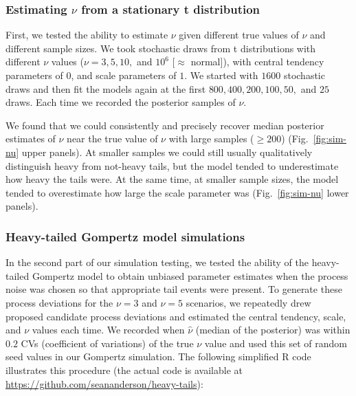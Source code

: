 \subsubsection{Estimating $\nu$ from a stationary t distribution}

First, we tested the ability to estimate $\nu$ given different true values of
$\nu$ and different sample sizes. We took stochastic draws from t
distributions with different $\nu$ values ($\nu = 3, 5, 10,$ and $10^6$
[$\approx$ normal]), with central tendency parameters of $0$, and scale
parameters of $1$. We started with $1600$ stochastic draws and then fit the
models again at the first $800, 400, 200, 100, 50,$ and $25$ draws. Each time
we recorded the posterior samples of $\nu$.

We found that we could consistently and precisely recover median posterior
estimates of $\nu$ near the true value of $\nu$ with large samples ($\ge 200$)
(Fig.~\ref{fig:sim-nu} upper panels). At smaller samples we could still
usually qualitatively distinguish heavy from not-heavy tails, but the model
tended to underestimate how heavy the tails were. At the same time, at smaller
sample sizes, the model tended to overestimate how large the scale parameter
was (Fig.~\ref{fig:sim-nu} lower panels).

\subsubsection{Heavy-tailed Gompertz model simulations}

In the second part of our simulation testing, we tested the ability of the
heavy-tailed Gompertz model to obtain unbiased parameter estimates when the
process noise was chosen so that appropriate tail events were present. To
generate these process deviations for the $\nu = 3$ and $\nu = 5$ scenarios,
we repeatedly drew proposed candidate process deviations and estimated the
central tendency, scale, and $\nu$ values each time. We recorded when
$\hat{\nu}$ (median of the posterior) was within $0.2$ CVs (coefficient of
variations) of the true $\nu$ value and used this set of random seed values in
our Gompertz simulation. The following simplified R code illustrates this
procedure (the actual code is available at
\url{https://github.com/seananderson/heavy-tails}):

